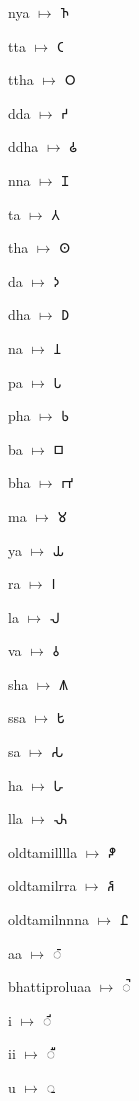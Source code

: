 {\noindent nya $\mapsto$ {\brfont 𑀜}\par
\noindent tta $\mapsto$ {\brfont 𑀝}\par
\noindent ttha $\mapsto$ {\brfont 𑀞}\par
\noindent dda $\mapsto$ {\brfont 𑀟}\par
\noindent ddha $\mapsto$ {\brfont 𑀠}\par
\noindent nna $\mapsto$ {\brfont 𑀡}\par
\noindent ta $\mapsto$ {\brfont 𑀢}\par
\noindent tha $\mapsto$ {\brfont 𑀣}\par
\noindent da $\mapsto$ {\brfont 𑀤}\par
\noindent dha $\mapsto$ {\brfont 𑀥}\par
\noindent na $\mapsto$ {\brfont 𑀦}\par
\noindent pa $\mapsto$ {\brfont 𑀧}\par
\noindent pha $\mapsto$ {\brfont 𑀨}\par
\noindent ba $\mapsto$ {\brfont 𑀩}\par
\noindent bha $\mapsto$ {\brfont 𑀪}\par
\noindent ma $\mapsto$ {\brfont 𑀫}\par
\noindent ya $\mapsto$ {\brfont 𑀬}\par
\noindent ra $\mapsto$ {\brfont 𑀭}\par
\noindent la $\mapsto$ {\brfont 𑀮}\par
\noindent va $\mapsto$ {\brfont 𑀯}\par
\noindent sha $\mapsto$ {\brfont 𑀰}\par
\noindent ssa $\mapsto$ {\brfont 𑀱}\par
\noindent sa $\mapsto$ {\brfont 𑀲}\par
\noindent ha $\mapsto$ {\brfont 𑀳}\par
\noindent lla $\mapsto$ {\brfont 𑀴}\par
\noindent oldtamilllla $\mapsto$ {\brfont 𑀵}\par
\noindent oldtamilrra $\mapsto$ {\brfont 𑀶}\par
\noindent oldtamilnnna $\mapsto$ {\brfont 𑀷}\par
\noindent aa $\mapsto$ {\brfont 𑀸}\par
\noindent bhattiproluaa $\mapsto$ {\brfont 𑀹}\par
\noindent i $\mapsto$ {\brfont 𑀺}\par
\noindent ii $\mapsto$ {\brfont 𑀻}\par
\noindent u $\mapsto$ {\brfont 𑀼}\par
}
